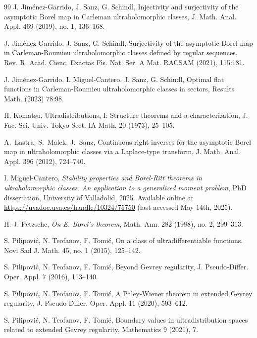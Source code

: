 \documentclass[11pt,a4paper]{article}
\theoremstyle{plain}
\theoremstyle{definition}
\numberwithin{equation}{section}
\begin{document}
\begin{thebibliography}{99}
 J. Jim\'enez-Garrido, J. Sanz, G. Schindl, Injectivity and surjectivity of the asymptotic Borel map in Carleman ultraholomorphic classes, J. Math. Anal. Appl. 469 (2019), no. 1, 136--168.

 J. Jim\'enez-Garrido, J. Sanz, G. Schindl, Surjectivity of the asymptotic Borel map in Carleman-Roumieu ultraholomorphic classes defined by regular sequences, Rev. R. Acad. Cienc. Exactas F{\'\i}s. Nat. Ser. A Mat. RACSAM (2021), 115:181.

 J. Jim\'enez-Garrido, I. Miguel-Cantero, J. Sanz, G. Schindl, Optimal flat functions in
Carleman-Roumieu ultraholomorphic classes in sectors, Results Math. (2023) 78:98.%

 H. Komatsu, Ultradistributions, I: Structure theorems and a characterization, J. Fac. Sci. Univ. Tokyo Sect. IA Math.  20 (1973), 25--105.

A.~Lastra, S.~Malek, J.~Sanz,
\newblock Continuous right inverses for the asymptotic {B}orel map in
  ultraholomorphic classes via a {L}aplace-type transform,
\newblock J. Math. Anal. Appl. 396 (2012), 724--740.

 I. Miguel-Cantero, \emph{Stability properties and Borel-Ritt theorems in ultraholomorphic classes. An application to a generalized moment problem}, PhD dissertation, University of Valladolid, 2025. Available online at \href{https://uvadoc.uva.es/handle/10324/75750}{https://uvadoc.uva.es/handle/10324/75750} (last accessed May 14th, 2025).


 H.-J. Petzsche, \emph{On E. Borel's theorem}, Math. Ann. 282 (1988), no. 2, 299--313.

 S. Pilipovi{\'c}, N. Teofanov, F. Tomi{\'c}, On a class of ultradifferentiable functions. Novi Sad J. Math. 45, no. 1  (2015), 125--142.

 S. Pilipovi{\'c}, N. Teofanov, F. Tomi{\'c}, Beyond Gevrey regularity, J. Pseudo-Differ. Oper. Appl. 7 (2016), 113--140.


 S. Pilipovi{\'c}, N. Teofanov,  F. Tomi{\'c}, A Paley-Wiener theorem in extended Gevrey regularity, J. Pseudo-Differ. Oper. Appl. 11 (2020), 593--612.

 S. Pilipovi{\'c}, N. Teofanov, F. Tomi{\'c},
Boundary values in ultradistribution spaces related to extended
Gevrey regularity, Mathematics 9 (2021), 7.


\end{thebibliography}
\end{document}
